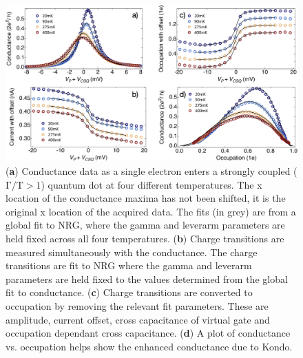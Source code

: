 \begin{figure}[ht]
  \begin{center}
    \includegraphics[width=1\textwidth]{figures/ch3/crop_PosterFiguresMaster.010.png}
    \caption[Method to determine gamma and leverarm and show Kondo enhancement of conductance in the mixed-valence regime]{\label{fig:ch3/cond_occ_gf} 
    (\textbf{a}) Conductance data as a single electron enters a strongly coupled ($\mathrm{\Gamma/T > 1}$) quantum dot at four different temperatures. The x location of the conductance maxima has not been shifted, it is the original x location of the acquired data. The fits (in grey) are from a global fit to NRG, where the gamma and leverarm parameters are held fixed across all four temperatures. (\textbf{b}) Charge transitions are measured simultaneously with the conductance. The charge transitions are fit to NRG where the gamma and leverarm parameters are held fixed to the values determined from the global fit to conductance. (\textbf{c}) Charge transitions are converted to occupation by removing the relevant fit parameters. These are amplitude, current offset, cross capacitance of virtual gate and occupation dependant cross capacitance. (\textbf{d}) A plot of conductance vs. occupation helps show the enhanced conductance due to Kondo.}
  \end{center}
\end{figure}



